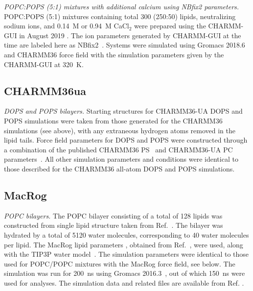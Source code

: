 \documentclass[journal=jpcbfk,manuscript=article]{achemso}
\newcommand{\todo}[1]{\textcolor{red}{#1}}
\begin{document}
\noindent
{\it POPC:POPS (5:1) mixtures with  additional calcium using NBfix2 parameters.}
POPC:POPS (5:1) mixtures containing total 300 (250:50) lipids, neutralizing sodium ions, 
and 0.14~M or 0.94~M CaCl$_2$ were prepared using the CHARMM-GUI in August 2019 \cite{lee16,jo18}.
The ion parameters generated by CHARMM-GUI at the time are labeled here as NBfix2~\cite{han2018graph}. Systems were simulated using Gromacs 2018.6 \cite{abraham2015gromacs} and CHARMM36 force field with the simulation parameters given
by the CHARMM-GUI at 320~K.  \\

\subsection{CHARMM36ua}
\noindent
{\it DOPS and POPS bilayers.} 
Starting structures for CHARMM36-UA DOPS and POPS simulations were taken from those generated for the CHARMM36 simulations (see above),
with any extraneous hydrogen atoms removed in the lipid tails. Force field parameters for DOPS and POPS were constructed through a
combination of the published CHARMM36 PS~\cite{venable13} and CHARMM36-UA PC parameters~\cite{lee14}.
All other simulation parameters and conditions were identical to those described for the CHARMM36 all-atom DOPS and POPS simulations.


\subsection{MacRog}
\noindent
{\it POPC bilayers.} 
The POPC bilayer consisting of a total of 128 lipids was constructed from single lipid structure taken 
from Ref.~. The bilayer was hydrated by a total of 5120 water 
molecules, corresponding to 40 water molecules per lipid.
The MacRog lipid parameters \cite{kulig15b}, obtained from Ref.~, were used,
along with the TIP3P water model~\cite{jorgensen83}. The simulation parameters were identical to those used for 
POPC/POPC mixtures with the MacRog force field, see below. The simulation was run for 200~ns using Gromacs 2016.3~\cite{abraham2015gromacs}, 
out of which 150~ns were used for analyses. The simulation data and related files are available from Ref. .
\end{document}
